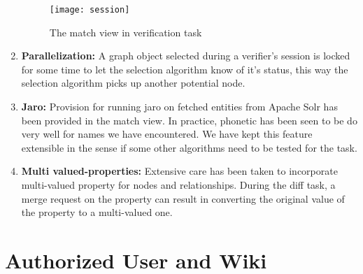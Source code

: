 \begin{enumerate}
\begin{figure}[H]
\begin{center}  
\texttt{[image: session]} 
\caption{The match view in verification task}
\label{fig:session}
\end{center}
\end{figure}


\item \textbf{Parallelization:} A graph object selected during a verifier's session is locked for some time to let the selection algorithm know of it's status, this way the selection algorithm picks up another potential node.

\item \textbf{Jaro:} Provision for running jaro on fetched entities from Apache Solr has been provided in the match view. In practice, phonetic has been seen to be do very well for names we have encountered. We have kept this feature extensible in the sense if some other algorithms need to be tested for the task.

\item \textbf{Multi valued-properties:} Extensive care has been taken to incorporate multi-valued property for nodes and relationships. During the diff task, a merge request on the property can result in converting the original value of the property to a multi-valued one. 

\end{enumerate}





 

\section{Authorized User and Wiki}


